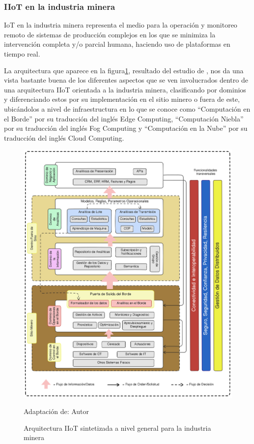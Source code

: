 \documentclass[stu,12pt,floatsintext]{apa7}
\begin{document}
	\subsubsection{IIoT en la industria minera}
	IoT en la industria minera representa el medio para la operación y monitoreo remoto de sistemas de producción complejos en los que se minimiza la intervención completa y/o parcial humana, haciendo uso de plataformas en tiempo real\cite{molaei:hal-02940030}.
	
	La arquitectura que aparece en la figura\ref{iiot_minas_arq_sintetizada}, resultado del estudio de  \cite{iot1020029}, nos da una vista bastante buena de los diferentes aspectos que se ven involucrados dentro de una arquitectura IIoT orientada a la industria minera, clasificando por dominios y diferenciando estos por su implementación en el sitio minero o fuera de este, ubicándolos a nivel de infraestructura en lo que se conoce como ``Computación en el Borde'' por su traducción del inglés Edge Computing, ``Computación Niebla'' por su traducción del inglés Fog Computing y ``Computación en la Nube'' por su traducción del inglés Cloud Computing.
		\begin{figure}[H]
		\centering
		\includegraphics[scale=0.13]{Adaptacion_Synthesized_high_level_IIoT_architecture_for_mining_industry.png}
		\captionsetup{justification=centering}
		\caption{Arquitectura IIoT sintetizada a nivel general para la industria minera}
		\small
		\label{iiot_minas_arq_sintetizada}
		Adaptación de: Autor
	\end{figure}
\end{document}
